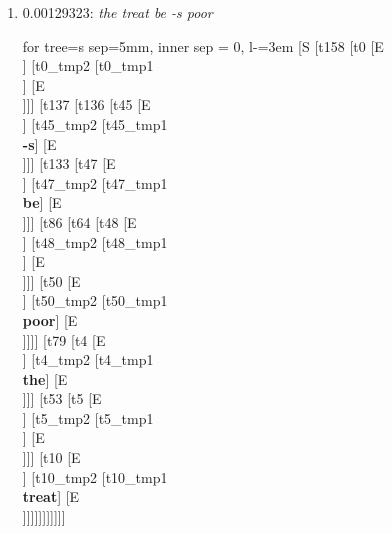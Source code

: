 \documentclass[11pt]{article}
\begin{document}
\begin{enumerate}
	\item  0.00129323: \textit{the treat be -s poor} \\[0.5em]
	\begin{forest}
	for tree={s sep=5mm, inner sep = 0, l-=3em}
	[S [t158 [t0 [E\\ ] [t0_tmp2 [t0_tmp1\\ ] [E\\ ]]] [t137 [t136 [t45 [E\\ ] [t45_tmp2 [t45_tmp1\\\textbf{-s}] [E\\ ]]] [t133 [t47 [E\\ ] [t47_tmp2 [t47_tmp1\\\textbf{be}] [E\\ ]]] [t86 [t64 [t48 [E\\ ] [t48_tmp2 [t48_tmp1\\ ] [E\\ ]]] [t50 [E\\ ] [t50_tmp2 [t50_tmp1\\\textbf{poor}] [E\\ ]]]] [t79 [t4 [E\\ ] [t4_tmp2 [t4_tmp1\\\textbf{the}] [E\\ ]]] [t53 [t5 [E\\ ] [t5_tmp2 [t5_tmp1\\ ] [E\\ ]]] [t10 [E\\ ] [t10_tmp2 [t10_tmp1\\\textbf{treat}] [E\\ ]]]]]]]]]]]
	\end{forest}
	\newpage


\end{enumerate}
\end{document}
